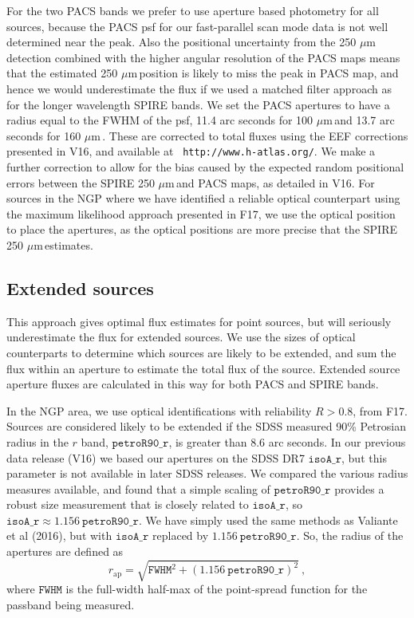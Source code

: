\documentclass[useAMS,usenatbib]{mn2e}
\def\mic{ $\mu $m\,}
\begin{document}
For the two PACS bands we prefer to use aperture based photometry for
all sources, because the PACS psf for our fast-parallel scan mode data
is not well determined near the peak. Also the positional uncertainty
from the 250\mic detection combined with the higher angular resolution
of the PACS maps means that the estimated 250\mic position is likely
to miss the peak in PACS map, and hence we would underestimate the
flux if we used a matched filter approach as for the longer wavelength
SPIRE bands. We set the PACS apertures to have a radius equal to the
FWHM of the psf, 11.4 arc seconds for 100\mic and 13.7 arc seconds for
160\mic.  These are corrected to total fluxes using the EEF
corrections presented in V16, and available at {\tt
  http://www.h-atlas.org/}.  We make a further correction to allow for
the bias caused by the expected random positional errors between the
SPIRE 250\mic and PACS maps, as detailed in V16.
For sources in the NGP where we have identified a reliable optical
counterpart using the maximum likelihood approach presented in
F17, we use the optical position to place the
apertures, as the optical positions are more precise that the SPIRE
250\mic estimates. 

\subsection{Extended sources} 

This approach gives optimal flux estimates for point sources, but will
seriously underestimate the flux for extended sources. We use the
sizes of optical counterparts to determine which sources are likely to
be extended, and sum the flux within an aperture to estimate the total
flux of the source. Extended source aperture fluxes are calculated in
this way for both PACS and SPIRE bands. 

In the NGP area, we use optical identifications
with reliability $R>0.8$, from F17.  Sources are
considered likely to be extended if the SDSS measured 90\% Petrosian
radius in the $r$ band, $\mathtt{petroR90\_r}$, is greater than 8.6
arc seconds. In our previous data release (V16) we based our apertures
on the SDSS DR7 $\mathtt{isoA\_r}$, but this parameter is not
available in later SDSS releases. We compared the various radius
measures available, and found that a simple scaling of
$\mathtt{petroR90\_r}$ provides a robust size measurement that is
closely related to $\mathtt{isoA\_r}$, so $\mathtt{isoA\_r} \approx
1.156 \ \mathtt{petroR90\_r}$.  We have simply used the same methods
as Valiante et al (2016), but with $\mathtt{isoA\_r}$ replaced by
$1.156 \ \mathtt{petroR90\_r}$. So, the radius of the apertures are
defined as
\begin{equation} 
r_\mathrm{ap} = \sqrt{ \mathtt{FWHM}^2 + {(1.156
    \ \mathtt{petroR90\_r})}^2}\ , 
\end{equation}
where $\mathtt{FWHM}$ is the full-width half-max of the point-spread
function for the passband being measured.  
\end{document}
